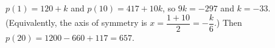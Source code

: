 $p(1)=120+k$ and $p(10)=417+10k$, so $9k=-297$ and $k=-33$. (Equivalently, the axis of symmetry is $x=\dfrac{1+10}{2}=-\dfrac k6$.) Then $p(20)=1200-660+117=\boxed{657}$.
